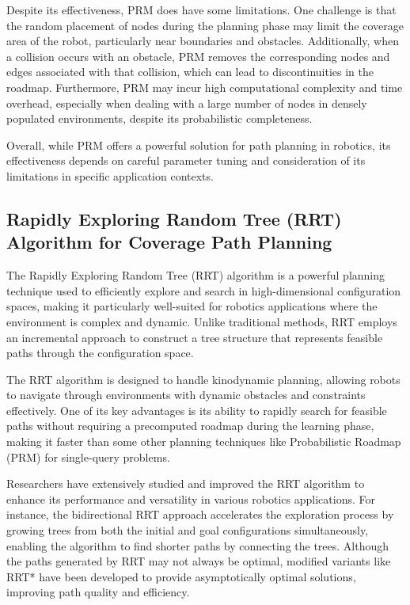 \vspace*{6mm}

Despite its effectiveness, PRM does have some limitations. One challenge is that the random placement of nodes during the planning phase may limit the coverage area of the robot, particularly near boundaries and obstacles. Additionally, when a collision occurs with an obstacle, PRM removes the corresponding nodes and edges associated with that collision, which can lead to discontinuities in the roadmap. Furthermore, PRM may incur high computational complexity and time overhead, especially when dealing with a large number of nodes in densely populated environments, despite its probabilistic completeness.

\vspace*{6mm}

Overall, while PRM offers a powerful solution for path planning in robotics, its effectiveness depends on careful parameter tuning and consideration of its limitations in specific application contexts.


\subsection{Rapidly Exploring Random Tree (RRT) Algorithm for Coverage Path Planning}

The Rapidly Exploring Random Tree (RRT) algorithm is a powerful planning technique used to efficiently explore and search in high-dimensional configuration spaces, making it particularly well-suited for robotics applications where the environment is complex and dynamic. Unlike traditional methods, RRT employs an incremental approach to construct a tree structure that represents feasible paths through the configuration space.

\vspace*{6mm}

The RRT algorithm is designed to handle kinodynamic planning, allowing robots to navigate through environments with dynamic obstacles and constraints effectively. One of its key advantages is its ability to rapidly search for feasible paths without requiring a precomputed roadmap during the learning phase, making it faster than some other planning techniques like Probabilistic Roadmap (PRM) for single-query problems.

\vspace*{6mm}

Researchers have extensively studied and improved the RRT algorithm to enhance its performance and versatility in various robotics applications. For instance, the bidirectional RRT approach accelerates the exploration process by growing trees from both the initial and goal configurations simultaneously, enabling the algorithm to find shorter paths by connecting the trees. Although the paths generated by RRT may not always be optimal, modified variants like RRT* have been developed to provide asymptotically optimal solutions, improving path quality and efficiency.


